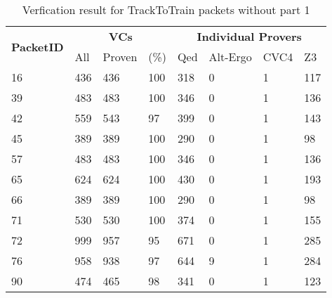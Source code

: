 \begin{table}[hbt]
\begin{center}
    \begin{tabular}{|m{10ex}|m{5ex}m{5ex}m{5ex}|m{5ex}m{5ex}m{5ex}m{5ex}|}
\hline
\multirow{2}{*}{\textbf{PacketID}} &
\multicolumn{3}{c|}{ \textbf{VCs}} &
\multicolumn{4}{c|}{\textbf{Individual Provers}}\\
\cline{2-8}
               &  All & Proven & (\%) & Qed & Alt-Ergo & CVC4 & Z3  \\
\hline
\hline
16 & 436 & 436 & 100 & 318 & 0 & 1 & 117\\
\hline
39 & 483 & 483 & 100 & 346 & 0 & 1 & 136\\
\hline
42 & 559 & 543 & 97 & 399 & 0 & 1 & 143\\
\hline
45 & 389 & 389 & 100 & 290 & 0 & 1 & 98\\
\hline
57 & 483 & 483 & 100 & 346 & 0 & 1 & 136\\
\hline
65 & 624 & 624 & 100 & 430 & 0 & 1 & 193\\
\hline
66 & 389 & 389 & 100 & 290 & 0 & 1 & 98\\
\hline
71 & 530 & 530 & 100 & 374 & 0 & 1 & 155\\
\hline
72 & 999 & 957 & 95 & 671 & 0 & 1 & 285\\
\hline
76 & 958 & 938 & 97 & 644 & 9 & 1 & 284\\
\hline
90 & 474 & 465 & 98 & 341 & 0 & 1 & 123\\
\hline
\end{tabular}
\end{center}
\caption{\label{tbl:packets-without-niter-tracktotrain-part1} Verfication result for TrackToTrain packets without  part 1}
\end{table}

\FloatBarrier  %

